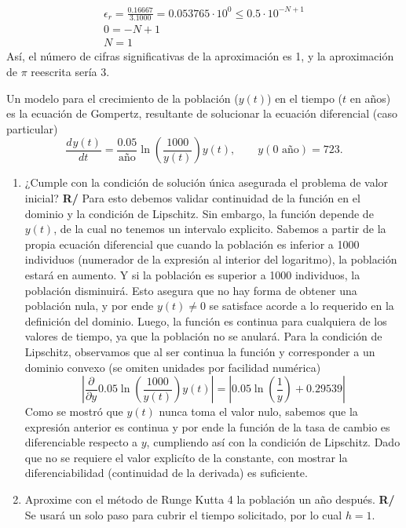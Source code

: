 \documentclass[12pt]{article}
\newcommand{\diff}[3]{\frac{d^{#3} #1}{d#2^{#3}}}
\newcommand{\pdiff}[3]{\frac{\partial^{#3} #1}{\partial#2^{#3}}}
\begin{document}
\begin{enumerate}[leftmargin=*,widest=9]
{\begin{enumerate}[label=\alph*]
\begin{eqnarray*}
\epsilon_r = \frac{0.16667}{3.1000} = 0.053765 \cdot {10}^0 \leq 0.5 \cdot 10^{-N+1}\\
0 = -N + 1\\
N = 1
\end{eqnarray*}
Así, el número de cifras significativas de la aproximación es 1, y la aproximación de \(\pi \) reescrita sería \(3\).
    \end{enumerate}
    \item Un modelo para el crecimiento de la población (\(y(t)\)) en el tiempo (\(t\) en años) es la ecuación de Gompertz, resultante de solucionar la ecuación diferencial (caso particular)
    \[
\diff{y(t)}{t}{} = \frac{0.05}{\text{año}}\ln \left( \frac{1000}{y(t)} \right) y(t), \qquad y(0 \text{ año}) = 723.
    \]
    \begin{enumerate}[label=\alph*]
    \item ¿Cumple con la condición de solución única asegurada el problema de valor inicial?
\textbf{R/} Para esto debemos validar continuidad de la función en el dominio y la condición de Lipschitz. Sin embargo, la función depende de \(y(t)\), de la cual no tenemos un intervalo explicito.
Sabemos a partir de la propia ecuación diferencial que cuando la población es inferior a 1000 individuos (numerador de la expresión al interior del logaritmo), la población estará en aumento. Y si la población es superior a 1000 individuos, la población disminuirá. Esto asegura que no hay forma de obtener una población nula, y por ende \(y(t) \neq 0\) se satisface acorde a lo requerido en la definición del dominio. Luego, la función es continua para cualquiera de los valores de tiempo, ya que la población no se anulará.
Para la condición de Lipschitz, observamos que al ser continua la función y corresponder a un dominio convexo (se omiten unidades por facilidad numérica)
\[
\left\vert \pdiff{}{y}{} 0.05\ln \left( \frac{1000}{y(t)} \right) y(t) \right\vert = \left\vert 0.05\ln \left( \frac{1}{y} \right) + 0.29539 \right\vert
\]
Como se mostró que \(y(t)\) nunca toma el valor nulo, sabemos que la expresión anterior es continua y por ende la función de la tasa de cambio es diferenciable respecto a \(y\), cumpliendo así con la condición de Lipschitz.
Dado que no se requiere el valor explicíto de la constante, con mostrar la diferenciabilidad (continuidad de la derivada) es suficiente.
    \item Aproxime con el método de Runge Kutta 4 la población un año después.
\textbf{R/} Se usará un solo paso para cubrir el tiempo solicitado, por lo cual \(h = 1\).

\end{enumerate}}
\end{enumerate}
\end{document}
